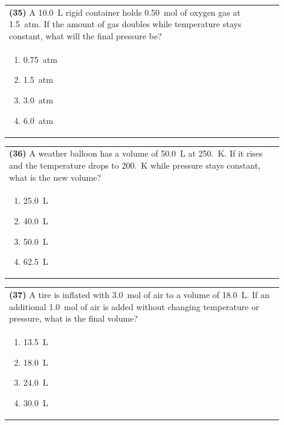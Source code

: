 \documentclass{article}
\begin{document}
{{\vspace{0.2cm}
\noindent\begin{tabular}{|p{0.9\linewidth}|}
\hline
\textbf{(35)} A 10.0~L rigid container holds 0.50~mol of oxygen gas at 1.5~atm. If the amount of gas doubles while temperature stays constant, what will the final pressure be?\\[0.2cm]
\begin{minipage}[t]{0.85\linewidth}
\begin{enumerate}[label=\alph*.]
\item 0.75~atm
\item 1.5~atm
\item 3.0~atm
\item 6.0~atm
\end{enumerate}
\end{minipage}\\[0.2cm]
\hline
\end{tabular}

\vspace{0.2cm}
\noindent\begin{tabular}{|p{0.9\linewidth}|}
\hline
\textbf{(36)} A weather balloon has a volume of 50.0~L at 250.~K. If it rises and the temperature drops to 200.~K while pressure stays constant, what is the new volume?\\[0.2cm]
\begin{minipage}[t]{0.85\linewidth}
\begin{enumerate}[label=\alph*.]
\item 25.0~L
\item 40.0~L
\item 50.0~L
\item 62.5~L
\end{enumerate}
\end{minipage}\\[0.2cm]
\hline
\end{tabular}
\newpage

\vspace{0.2cm}
\noindent\begin{tabular}{|p{0.9\linewidth}|}
\hline
\textbf{(37)} A tire is inflated with 3.0~mol of air to a volume of 18.0~L. If an additional 1.0~mol of air is added without changing temperature or pressure, what is the final volume?\\[0.2cm]
\begin{minipage}[t]{0.85\linewidth}
\begin{enumerate}[label=\alph*.]
\item 13.5~L
\item 18.0~L
\item 24.0~L
\item 30.0~L
\end{enumerate}
\end{minipage}\\[0.2cm]
\hline
\end{tabular}

}}
\end{document}

